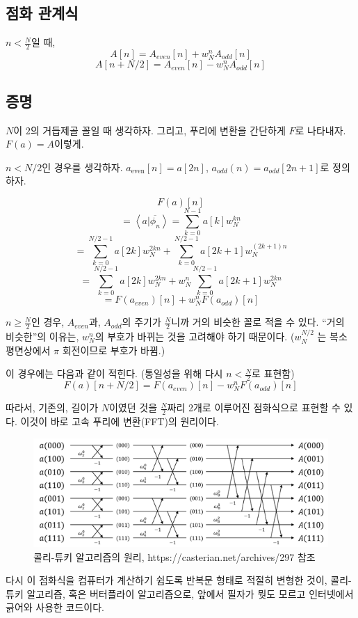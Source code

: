 \documentclass[section, oneside]{oblivoir}
\begin{document}
\subsection{점화 관계식}
$n<\frac{N}{2}$일 때,
$$A[n] = A_{even}[n] + w _N^n A_{odd}[n] $$
$$A[n + N/2] = A_{even}[n] - w _N^n A_{odd}[n] $$

\subsection{증명}

$N$이 $2$의 거듭제골 꼴일 때 생각하자.
그리고, 푸리에 변환을 간단하게 $F$로 나타내자. $F(a)= A$이렇게.

$n<N/2$인 경우를 생각하자. 
$a _{\text{even}} [n]= a[2n]$, ${a _{odd}} (n)= a_{odd}[2n+1]$로 정의하자.

$$F(a)[n]$$
$$= \left\langle a | \overline{\phi_n} \right\rangle = \sum _{k=0}^{N-1} a[k] w _N^{kn}$$
$$= \sum _{k=0}^{N/2-1} a[2k] w _N^{2kn} + \sum _{k=0} ^{N/2-1} a[2k+1] w _N^{(2k+1)n}$$
$$= \sum _{k=0}^{N/2-1} a[2k] w _N^{2kn} + w _N^n \sum _{k=0} ^{N/2-1} a[2k+1]w _N^{2kn}$$
$$=F( a _{even} )[n]+w _N^n F( a _{odd} )[n]$$

$n \ge \frac{N}{2}$인 경우, $A _{even}$과, $A _{odd}$의 주기가 $\frac{N}{2}$니까 거의 비슷한 꼴로 적을 수 있다. ``거의 비슷한''의 이유는, $w _{N}^{n}$의 부호가 바뀌는 것을 고려해야 하기 때문이다. ($w _{N}^{N/2}$ 는 복소평면상에서 $\pi$ 회전이므로 부호가 바뀜.)


이 경우에는 다음과 같이 적힌다. (통일성을 위해 다시 $n< \frac{N}{2}$로 표현함)
$$F(a)\left[n + N/2 \right] = F( a_{even} )[n] - w_N^n F( a_{odd} )[n] $$

따라서, 기존의, 길이가 $N$이였던 것을 $\frac{N}{2}$짜리 2개로 이루어진 점화식으로 표현할 수 있다. 이것이 바로 고속 푸리에 변환(FFT)의 원리이다.

\begin{figure}[ht]
    \centering
    \includegraphics[width=.7\textwidth]{images/image01.png}
    \caption{콜리-튜키 알고리즘의 원리, https://casterian.net/archives/297 참조}
    \label{fig:my_label}
\end{figure}


다시 이 점화식을 컴퓨터가 계산하기 쉽도록 반복문 형태로 적절히 변형한 것이, 콜리-튜키 알고리즘, 혹은 버터플라이 알고리즘으로, 앞에서 필자가 뭣도 모르고 인터넷에서 긁어와 사용한 코드이다.
\end{document}
